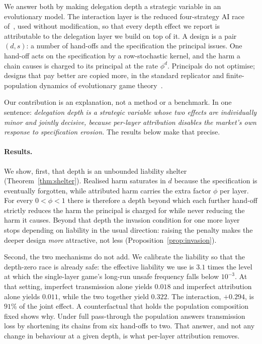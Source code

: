 \documentclass[11pt,a4paper]{article}
\theoremstyle{definition}
\begin{document}
We answer both by making delegation depth a strategic variable in an
evolutionary model. The interaction layer is the reduced four-strategy AI race
of~\citet{domingos2026falling}, used without modification, so that every depth
effect we report is attributable to the delegation layer we build on top of it.
A design is a pair $(d,s)$: a number of hand-offs and the specification the
principal issues. One hand-off acts on the specification by a row-stochastic
kernel, and the harm a chain causes is charged to its principal at the rate
$\phi^{d}$. Principals do not optimise; designs that pay better are copied
more, in the standard replicator and finite-population dynamics of evolutionary
game theory~\citep{taylor1978ess,hofbauer1998evolutionary,traulsen2006stochastic}.

Our contribution is an explanation, not a method or a benchmark. In one
sentence: \emph{delegation depth is a strategic variable whose two effects are
individually minor and jointly decisive, because per-layer attribution disables
the market's own response to specification erosion.} The results below make
that precise.

\paragraph{Results.}
We show, first, that depth is an unbounded liability shelter
(Theorem~\ref{thm:shelter}). Realised harm saturates in $d$ because the specification is eventually
forgotten, while attributed harm carries the extra factor $\phi$ per layer. For
every $0<\phi<1$ there is therefore a depth beyond which each further hand-off
strictly reduces the harm the principal is charged for while never reducing
the harm it causes. Beyond that depth the invasion
condition for one more layer stops depending on liability in the usual
direction: raising the penalty makes the deeper design \emph{more} attractive,
not less (Proposition~\ref{prop:invasion}).

Second, the two mechanisms do not add. We calibrate the liability so that the depth-zero race is already safe: the
effective liability we use is $3.1$ times the level at which the single-layer
game's long-run unsafe frequency falls below $10^{-3}$. At that setting, imperfect
transmission alone yields $0.018$ and imperfect attribution alone yields
$0.011$, while the two together yield $0.322$. The interaction,
$+0.294$, is $91\%$ of the joint effect. A counterfactual that holds the population composition fixed shows why. Under
full pass-through the population answers transmission loss by shortening its
chains from six hand-offs to two. That answer, and not any change in behaviour
at a given depth, is what per-layer attribution removes.
\end{document}
